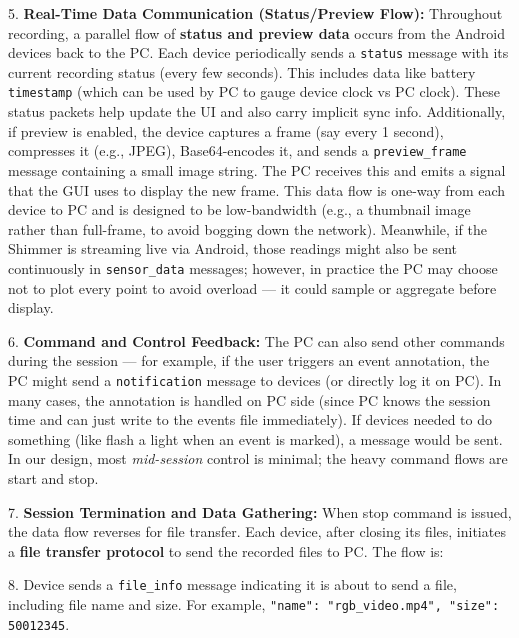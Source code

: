 5.  \textbf{Real-Time Data Communication (Status/Preview Flow):} Throughout
    recording, a parallel flow of \textbf{status and preview data} occurs
    from the Android devices back to the PC. Each device periodically
    sends a \texttt{status} message with its current recording status (every
    few
    seconds)\cite{DeviceServer}\cite{DeviceServer}.
    This includes data like battery %
    \texttt{timestamp} (which can be used by PC to gauge device clock vs PC
    clock). These status packets help update the UI and also carry
    implicit sync info. Additionally, if preview is enabled, the device
    captures a frame (say every 1 second), compresses it (e.g., JPEG),
    Base64-encodes it, and sends a \texttt{preview_frame} message containing a
    small image
    string\cite{DriverStressThermal2020}.
    The PC receives this and emits a signal that the GUI uses to display
    the new frame. This data flow is one-way from each device to PC and
    is designed to be low-bandwidth (e.g., a thumbnail image rather than
    full-frame, to avoid bogging down the network). Meanwhile, if the
    Shimmer is streaming live via Android, those readings might also be
    sent continuously in \texttt{sensor_data}
    messages\cite{DeviceServer};
    however, in practice the PC may choose not to plot every point to
    avoid overload --- it could sample or aggregate before display.

6.  \textbf{Command and Control Feedback:} The PC can also send other
    commands during the session --- for example, if the user triggers an
    event annotation, the PC might send a \texttt{notification} message to
    devices (or directly log it on PC). In many cases, the annotation is
    handled on PC side (since PC knows the session time and can just
    write to the events file immediately). If devices needed to do
    something (like flash a light when an event is marked), a message
    would be sent. In our design, most \textit{mid-session} control is minimal;
    the heavy command flows are start and stop.

7.  \textbf{Session Termination and Data Gathering:} When stop command is
    issued, the data flow reverses for file transfer. Each device, after
    closing its files, initiates a \textbf{file transfer protocol} to send
    the recorded files to PC. The flow is:

8.  Device sends a \texttt{file_info} message indicating it is about to send a
    file, including file name and
    size\cite{DeviceServer}\cite{DeviceServer}.
    For example, \texttt{"name": "rgb_video.mp4", "size": 50012345}.

